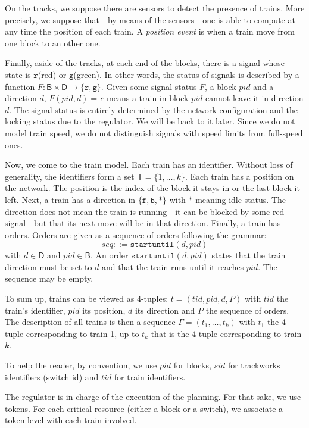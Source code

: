\documentclass[runningheads]{llncs}
\newcommand{\directions}{{\mathsf{D}}}
\newcommand{\blocks}{{\mathsf{B}}}
\newcommand{\forward}{{\mathtt{f}}}
\newcommand{\backward}{{\mathtt{b}}}
\newcommand{\idle}{{\mathtt{*}}}
\newcommand{\sigred}{{\mbox{$\mathtt{r}$}}\xspace}
\newcommand{\siggreen}{{\mbox{$\mathtt{g}$}}\xspace}
\newcommand{\su}{{\mbox{$\mathtt{startuntil}$}}\xspace}
\newcommand{\trains}{{\mathsf{T}}}
\begin{document}
On the tracks, we suppose there are sensors to detect the presence of trains. More precisely, we suppose that---by means of the sensors---one is able to compute at any time the position of each train. A \emph{position event} is when a train move from one block to an other one. 

Finally, aside of the tracks, at each end of the blocks, there is a signal whose state is \sigred (red) or \siggreen (green). In other words, the status of signals is described by a function $F: \blocks \times \directions \to \{ \sigred, \siggreen\}$. Given some signal status $F$, a block $pid$ and a direction $d$, $F(pid,d) = \sigred$ means a train in block $pid$ cannot leave it in direction $d$. The signal status is entirely determined by the network configuration and the locking status due to the regulator. We will be back to it later.  Since we do not model train speed, we do not distinguish signals with speed limits from full-speed ones. 

Now, we come to the train model. Each train has an identifier. Without loss of generality, the identifiers form a set  $\trains = \{1, \ldots, k\}$. Each train has a position on the network. The position is the index of the block it stays in or the last block it left. Next, a train has a direction in $\{\forward, \backward, \idle\}$ with $\idle$ meaning idle status.  The direction does not mean the train is running---it can be blocked by some red signal---but that its next move will be in that direction. Finally, a train has orders. Orders are given as a sequence of orders following the grammar:
$$  seq ::= \su(d,pid) $$
with $d \in \directions$ and $pid \in \blocks$. An order $\su(d, pid)$ states that the train direction must be set to $d$ and that the train runs until it reaches $pid$.  The sequence may be empty. 

To sum up, trains can be viewed as 4-tuples: $t = (tid, pid, d, P)$ with $tid$ the train's identifier, $pid$ its position, $d$ its direction and $P$ the sequence of orders. The description of all trains is then a sequence $\Gamma = (t_1, \ldots, t_k)$ with $t_1$ the 4-tuple corresponding to train 1, up to $t_k$ that is the 4-tuple corresponding to train $k$. 

To help the reader, by convention, we use $pid$ for blocks, $sid$ for trackworks identifiers (switch id) and $tid$ for train identifiers.  

The regulator is in charge of the execution of the planning. For that sake, we use tokens. For each critical resource (either a block or a switch), we associate a token level with each train involved. 
\end{document}

